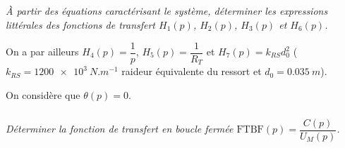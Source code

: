 \documentclass[10pt,fleqn]{article} %
\begin{document}
\begin{multicols}{2}

\subparagraph{}\textit{À partir des équations caractérisant le système, déterminer les expressions littérales des fonctions
de transfert $H_1( p)$, $H_2 ( p)$, $H_3 ( p)$ et $H_6 ( p)$.}
\ifprof
\begin{corrige}
\end{corrige}
\else
\fi

On a par ailleurs $H_4(p)=\dfrac{1}{p}$, $H_5(p)=\dfrac{1}{R_T}$ et $H_7(p)=k_{RS}d_0^2$ ($k_{RS}=\SI{1200e3}{N.m^{-1}}$ raideur équivalente du ressort et $d_0=\SI{0,035}{m}$).

On considère que $\theta(p)=0$. 

\subparagraph{}\textit{Déterminer la fonction de transfert en boucle fermée $\text{FTBF}(p)=\dfrac{C(p)}{U_M(p)}$.}
\ifprof
\begin{corrige}
\end{corrige}
\else
\fi



\end{multicols}
\end{document}
